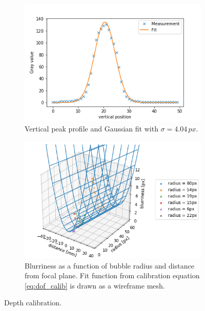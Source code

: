 			\begin{figure}
				\centering
				\begin{subfigure}[b]{\textwidth}
						\centering
						\includegraphics[scale=.6]{graphs/peak_profile_fit.png}
						\caption{Vertical peak profile and Gaussian fit with $\sigma = 4.04 \, px$.}
						\label{subfig:peak_profile}
					\end{subfigure}
					
				\begin{subfigure}[b]{\textwidth}
					\centering
						\includegraphics[scale=.6]{images/dof_calibration_fit.png}
						\caption{Blurriness as a function of bubble radius and distance from focal plane. Fit function from calibration equation \ref{eq:dof_calib} is drawn as a wireframe mesh.}
						\label{subfig:depth_calib_fit_result}
					\end{subfigure}								
				
				\caption{Depth calibration.}
				\label{fig:depth_calib}
			\end{figure}
			
